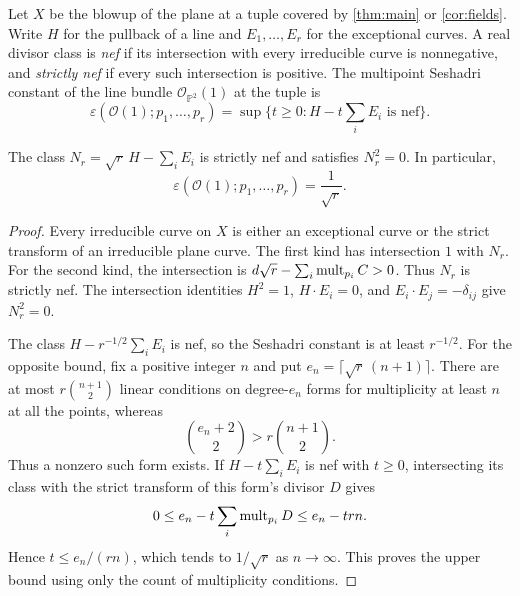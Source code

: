 Let $X$ be the blowup of the plane at a tuple covered by \cref{thm:main} or \cref{cor:fields}. Write $H$ for the pullback of a line and $E_1,\ldots,E_r$ for the exceptional curves. A real divisor class is \emph{nef} if its intersection with every irreducible curve is nonnegative, and \emph{strictly nef} if every such intersection is positive. The multipoint Seshadri constant of the line bundle $\mathcal{O}_{\mathbb{P}^2}(1)$ at the tuple is
\[
 \varepsilon(\mathcal{O}(1);p_1,\ldots,p_r)
 =\sup\{t\ge0:H-t\textstyle\sum_iE_i\text{ is nef}\}.
\]

\begin{corollary}\label{cor:sesha}
The class $N_r=\sqrt r\,H-\sum_iE_i$ is strictly nef and satisfies $N_r^2=0$. In particular,
\[
 \varepsilon(\mathcal{O}(1);p_1,\ldots,p_r)=\frac1{\sqrt r}.
\]
\end{corollary}
\begin{proof}
Every irreducible curve on $X$ is either an exceptional curve or the strict transform of an irreducible plane curve. The first kind has intersection $1$ with $N_r$. For the second kind, the intersection is $d\sqrt r-\sum_i\operatorname{mult}_{p_i}C>0$. Thus $N_r$ is strictly nef. The intersection identities $H^2=1$, $H\cdot E_i=0$, and $E_i\cdot E_j=-\delta_{ij}$ give $N_r^2=0$.

The class $H-r^{-1/2}\sum_iE_i$ is nef, so the Seshadri constant is at least $r^{-1/2}$. For the opposite bound, fix a positive integer $n$ and put $e_n=\lceil\sqrt r\,(n+1)\rceil$. There are at most $r\binom{n+1}{2}$ linear conditions on degree-$e_n$ forms for multiplicity at least $n$ at all the points, whereas
\[
 \binom{e_n+2}{2}>r\binom{n+1}{2}.
\]
Thus a nonzero such form exists. If $H-t\sum_iE_i$ is nef with $t\ge0$, intersecting its class with the strict transform of this form's divisor $D$ gives
\[
 0\le e_n-t\sum_i\operatorname{mult}_{p_i}D\le e_n-trn.
\]
Hence $t\le e_n/(rn)$, which tends to $1/\sqrt r$ as $n\to\infty$. This proves the upper bound using only the count of multiplicity conditions.
\end{proof}
